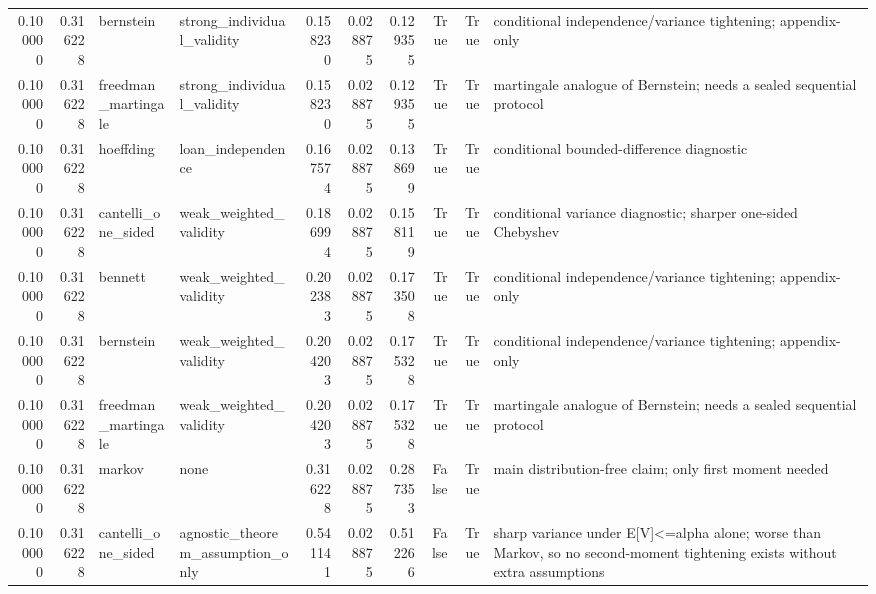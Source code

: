 \begin{tabular}{rrllrrrrrl}
0.100000 & 0.316228 & bernstein & strong\_individual\_validity & 0.158230 & 0.028875 & 0.129355 & True & True & conditional independence/variance tightening; appendix-only \\
0.100000 & 0.316228 & freedman\_martingale & strong\_individual\_validity & 0.158230 & 0.028875 & 0.129355 & True & True & martingale analogue of Bernstein; needs a sealed sequential protocol \\
0.100000 & 0.316228 & hoeffding & loan\_independence & 0.167574 & 0.028875 & 0.138699 & True & True & conditional bounded-difference diagnostic \\
0.100000 & 0.316228 & cantelli\_one\_sided & weak\_weighted\_validity & 0.186994 & 0.028875 & 0.158119 & True & True & conditional variance diagnostic; sharper one-sided Chebyshev \\
0.100000 & 0.316228 & bennett & weak\_weighted\_validity & 0.202383 & 0.028875 & 0.173508 & True & True & conditional independence/variance tightening; appendix-only \\
0.100000 & 0.316228 & bernstein & weak\_weighted\_validity & 0.204203 & 0.028875 & 0.175328 & True & True & conditional independence/variance tightening; appendix-only \\
0.100000 & 0.316228 & freedman\_martingale & weak\_weighted\_validity & 0.204203 & 0.028875 & 0.175328 & True & True & martingale analogue of Bernstein; needs a sealed sequential protocol \\
0.100000 & 0.316228 & markov & none & 0.316228 & 0.028875 & 0.287353 & False & True & main distribution-free claim; only first moment needed \\
0.100000 & 0.316228 & cantelli\_one\_sided & agnostic\_theorem\_assumption\_only & 0.541141 & 0.028875 & 0.512266 & False & True & sharp variance under E[V]<=alpha alone; worse than Markov, so no second-moment tightening exists without extra assumptions \\
\bottomrule
\end{tabular}
